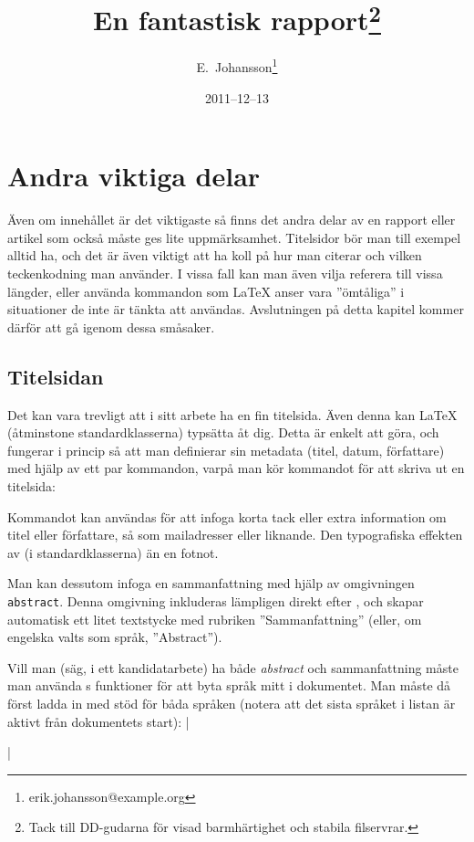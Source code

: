 \documentclass[10pt,../../a4.tex]{subfiles}
\begin{document}
\section{Andra viktiga delar}
Även om innehållet är det viktigaste så finns det andra delar av en
rapport eller artikel som också måste ges lite uppmärksamhet.
Titelsidor bör man till exempel alltid ha, och det är även viktigt att ha 
koll på
hur man citerar och vilken teckenkodning man använder. I vissa fall
kan man även vilja referera till vissa längder, eller använda kommandon
som \LaTeX{} anser vara ”ömtåliga” i situationer de inte är tänkta att
användas. Avslutningen på detta kapitel kommer därför att gå igenom dessa
småsaker.

\subsection{Titelsidan}%
Det kan vara trevligt att i sitt arbete ha en fin titelsida. Även denna
kan \LaTeX{} (åtminstone standardklasserna) typsätta åt dig. Detta är
enkelt att göra, och fungerar i princip så att man definierar sin
metadata (titel, datum, författare) med hjälp av ett par kommandon, varpå
man kör kommandot  för att skriva ut en titelsida:%
\begin{latexcode}
\title{En fantastisk rapport\thanks{Tack till DD-gudarna
   för visad barmhärtighet och stabila filservrar.}}
\date{2011--12--13}
\author{E.~Johansson\thanks{erik.johansson@example.org}}
\maketitle
\end{latexcode}

Kommandot  kan användas för att infoga korta tack eller extra
information om titel eller författare, så som mailadresser eller
liknande. Den typografiska effekten av  (i standardklasserna)
än en fotnot.

Man kan dessutom infoga en sammanfattning  med hjälp av
omgivningen \texttt{abstract}. Denna omgivning inkluderas lämpligen direkt
efter , och skapar automatisk ett litet textstycke med
rubriken ”Sammanfattning” (eller, om engelska valts som språk,
”Abstract”).

Vill man (säg, i ett kandidatarbete) ha både \emph{abstract} och
sammanfattning måste man använda s funktioner för att byta
språk mitt i dokumentet. Man måste då först ladda in  med stöd 
för båda språken (notera att det sista språket i listan är aktivt från
dokumentets start):
\latex|\usepackage[english,swedish]{babel}|
\end{document}

